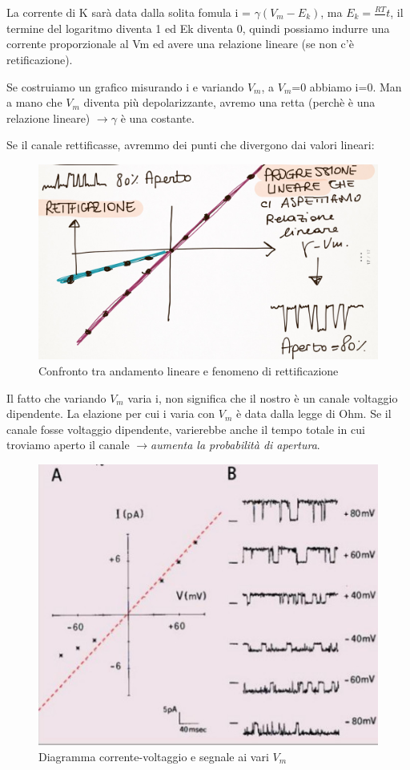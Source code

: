 \documentclass[a4paper,12pt]{article}
\newcommand{\lfreccia}{\ensuremath{\longrightarrow}}
\begin{document}
La corrente di K sarà data dalla solita fomula i = $\gamma (V_{m}-E_{k})$, ma $E_{k}= \frac{RT}{}t$, il termine del logaritmo diventa 1 ed Ek diventa 0, quindi possiamo indurre una corrente proporzionale al Vm ed avere una relazione lineare (se non c'è retificazione).

Se costruiamo un grafico misurando i e variando $V_{m}$, a $V_{m}$=0 abbiamo i=0. Man a mano che $V_{m}$ diventa più depolarizzante, avremo una retta (perchè è una relazione lineare) \lfreccia $\gamma$ è una costante.

Se il canale rettificasse, avremmo dei punti che divergono dai valori lineari: 

\begin{figure}[H]
\centering
\includegraphics[scale=0.1]{immagine/15.jpg}
\caption{Confronto tra andamento lineare e fenomeno di rettificazione}
\label{img:rett}
\end{figure} 

Il fatto che variando $V_{m}$ varia i, non significa che il nostro è un canale voltaggio dipendente. La elazione per cui i varia con $V_{m}$ è data dalla legge di Ohm. Se il canale fosse voltaggio dipendente, varierebbe anche il tempo totale in cui troviamo aperto il canale \lfreccia \emph{aumenta la probabilità di apertura}.

\begin{figure}[H]
\centering
\includegraphics[scale=0.4]{immagine/lineare.jpg}
\caption{Diagramma corrente-voltaggio e segnale ai vari $V_{m}$}
\end{figure}
 
\end{document}
